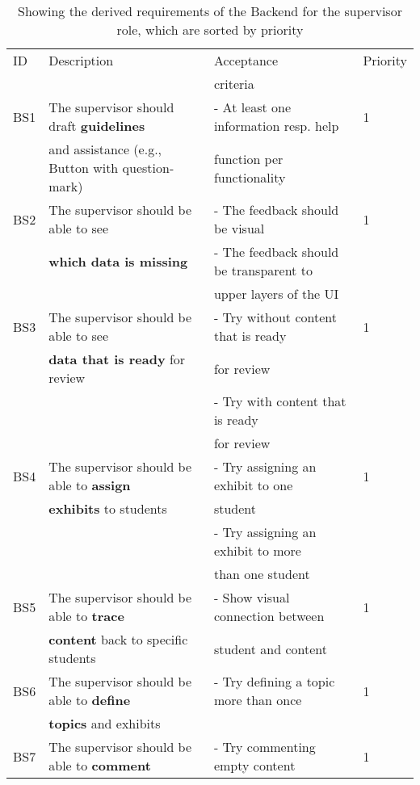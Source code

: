 \documentclass[twoside,openright,fleqn,pointlessnumbers,headinclude,,11pt,a4paper,BCOR5mm,footinclude,cleardoubleempty,abstracton %
                ]{scrreprt}
\begin{document}
	\begin{table}[h]
		\caption{Showing the derived requirements of the Backend for the supervisor role, which are sorted by priority}
	\begin{tabular}{llll}
	\hline
	ID 	& Description 	& Acceptance 	& Priority \\
	 	& 			 & criteria 	&  \\
		\hline
	BS1 	& The supervisor should draft \textbf{guidelines} 		& - At least one information resp. help 	& 1	\\
	 	& and assistance (e.g., Button with question-mark)	& function per functionality 			& 		\\
	\hline
	BS2 	& The supervisor should be able to see 				&  - The feedback should be visual	& 1	\\
	 	& \textbf{which data is missing} 					&  - The feedback should be transparent to	& 	\\
		& 											& upper layers of the UI & \\
	\hline
	BS3 	& The supervisor should be able to see 				& - Try without content that is ready & 1\\
	 	& \textbf{data that is ready} for review 				&  for review & \\
		&											& - Try with content that is ready		& \\
		&											& for review		& \\
	\hline
	BS4 	& The supervisor should be able to \textbf{assign} 	& - Try assigning an exhibit to one & 1\\
	 	& \textbf{exhibits} to students 					& student  & \\
		&										& - Try assigning an exhibit to more	& \\
		&										&	than one student				& \\
	\hline
	BS5 	& The supervisor should be able to \textbf{trace} 		& - Show visual connection between	& 1\\
	 	& \textbf{content} back to specific students 			&  student and content 	& \\
	\hline
	BS6 	& The supervisor should be able to \textbf{define}  	&  - Try defining a topic more than once	& 1\\
	 	& \textbf{topics} and exhibits  				    		&  	& \\
	\hline
	BS7 	& The supervisor should be able to \textbf{comment} 		& - Try commenting empty content		& 1\\

\end{tabular}
\end{table}
\end{document}
